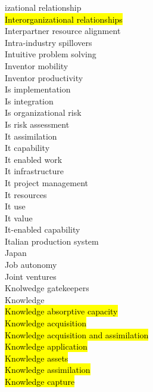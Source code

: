 \documentclass[a4paper]{article}
\begin{document}
\begin{multicols*}{2}
\begin{footnotesize}
izational relationship \\ \hl{Interorganizational relationships} \\ Interpartner resource alignment \\ Intra-industry spillovers \\ Intuitive problem solving \\ Inventor mobility \\ Inventor productivity \\ Is implementation \\ Is integration \\ Is organizational risk \\ Is risk assessment \\ It assimilation \\ It capability \\ It enabled work \\ It infrastructure \\ It project management \\ It resources \\ It use \\ It value \\ It-enabled capability \\ Italian production system \\ Japan \\ Job autonomy \\ Joint ventures \\ Knolwedge gatekeepers \\ Knowledge \\ \hl{Knowledge absorptive capacity} \\ \hl{Knowledge acquisition} \\ \hl{Knowledge acquisition and assimilation} \\ \hl{Knowledge application} \\ \hl{Knowledge assets} \\ \hl{Knowledge assimilation} \\ \hl{Knowledge capture} \
\end{footnotesize}
\end{multicols*}
\end{document}
